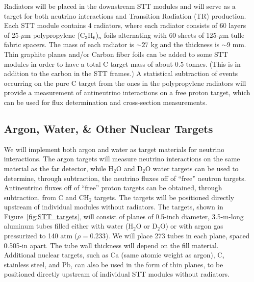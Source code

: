 Radiators will be placed in the downstream STT modules
and will serve as a target for both neutrino interactions 
and Transition Radiation (TR) production. Each STT module contains 
4 radiators, where each radiator consists of
60 layers of 25-$\mu$m polypropylene (C$_3$H$_6$)$_n$ 
foils alternating with 60 sheets of 125-$\mu$m tulle fabric spacers. 
The mass of each radiator is $\sim 27$ kg and the thickness is 
$\sim 9$ mm. %
Thin graphite planes and/or Carbon fiber foils can be added to some STT modules
in order to have a total C target mass of about 0.5 tonnes. (This is in addition to
the carbon in the STT frames.) A statistical subtraction of events occurring
on the pure C target from the ones in the polypropylene radiators will provide a measurement of
antineutrino interactions on a free proton target, which can be used for flux determination and cross-section
measurements.

\subsection{Argon, Water, \& Other Nuclear Targets}

We will implement both argon
and water as target materials for neutrino interactions.
The argon targets will measure neutrino interactions on the same material as the far detector, while
H$_2$O and D$_2$O water targets can be used to determine, through subtraction, the
neutrino fluxes off of ``free'' neutron targets. Antineutrino fluxes off of ``free''
proton targets can be obtained, through subtraction, from C and CH$_2$ targets.
The targets will be 
positioned directly upstream of individual modules without radiators. 
The targets, shown in 
Figure~\ref{fig:STT_targets}, will consist of planes of 0.5-inch diameter, 3.5-m-long aluminum tubes filled
either with water (H$_2$O or D$_2$O) or with argon gas pressurized to 140 atm ($\rho = 0.233$). 
We will place 273 tubes in each 
plane, spaced 0.505-in apart. The tube wall thickness will depend on the fill material.
Additional nuclear targets, such as Ca (same atomic weight as argon), C, stainless
steel, and Pb, can also be used in
the form of thin planes, to be positioned directly upstream of individual STT modules without radiators.


